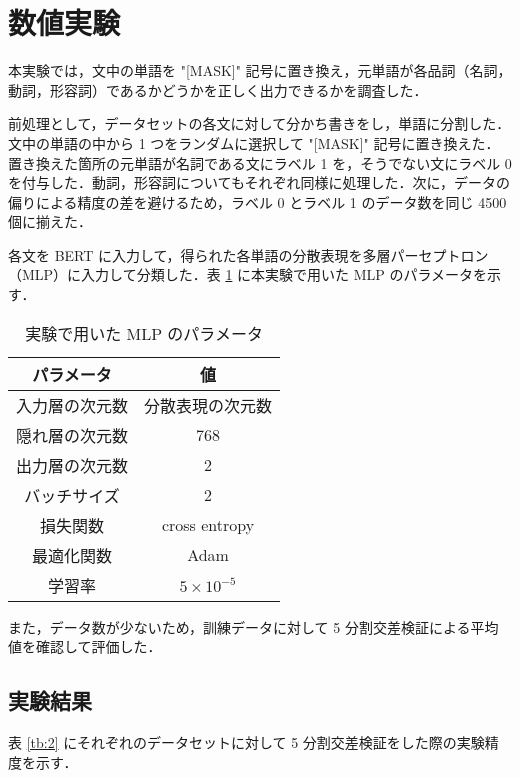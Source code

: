 \documentclass[twocolumn]{jarticle}
\begin{document}
\section{数値実験}
本実験では，文中の単語を "[MASK]" 記号に置き換え，元単語が各品詞（名詞，動詞，形容詞）であるかどうかを正しく出力できるかを調査した．\par
前処理として，データセットの各文に対して分かち書きをし，単語に分割した．文中の単語の中から 1 つをランダムに選択して "[MASK]" 記号に置き換えた．置き換えた箇所の元単語が名詞である文にラベル 1 を，そうでない文にラベル 0 を付与した．動詞，形容詞についてもそれぞれ同様に処理した．次に，データの偏りによる精度の差を避けるため，ラベル 0 とラベル 1 のデータ数を同じ 4500 個に揃えた．\par
各文を BERT に入力して，得られた各単語の分散表現を多層パーセプトロン（MLP）に入力して分類した．表 \ref{tb:1} に本実験で用いた MLP のパラメータを示す．

\begin{table}[htb]
	\caption{実験で用いた MLP のパラメータ}
	\begin{tabular}{| c |  c |} \hline
  パラメータ & 値  \\ \hline \hline
  入力層の次元数	& 分散表現の次元数 \\ %
  隠れ層の次元数	& 768 \\ 
  出力層の次元数	& 2 \\ 
  バッチサイズ		& 2 \\
  損失関数		& cross entropy \\
  最適化関数		& Adam \\
  学習率			& $5\times10^{-5}$ \\ \hline
	\end{tabular}
	\label{tb:1}
\end{table}





また，データ数が少ないため，訓練データに対して 5 分割交差検証による平均値を確認して評価した．





\subsection{実験結果}
表 \ref{tb:2} にそれぞれのデータセットに対して 5 分割交差検証をした際の実験精度を示す．
\end{document}
